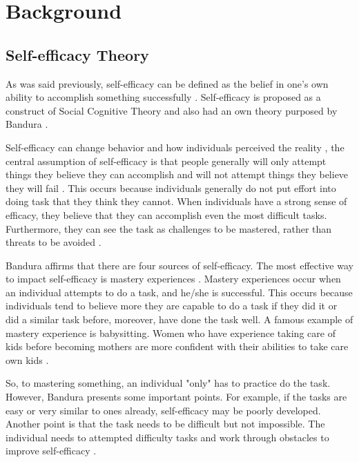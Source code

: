 \documentclass[10pt, conference]{IEEEtran}
\begin{document}
\section{Background}
\label{background}

\subsection{Self-efficacy Theory}
As was said previously, self-efficacy can be defined as the belief in one's own ability to accomplish something successfully  \cite{bandura1977self}. Self-efficacy is proposed as a construct of Social Cognitive Theory \cite{bandura1977social} and also had an own theory purposed by Bandura \cite{bandura1977self}. 

Self-efficacy can change behavior and how individuals perceived the reality \cite{bandura2010self}, the central assumption of self-efficacy is that people generally will only attempt things they believe they can accomplish and will not attempt things they believe they will fail \cite{bandura1977self}. This occurs because individuals generally do not put effort into doing task that they think they cannot. When individuals have a strong sense of efficacy, they believe that they can accomplish even the most difficult tasks. Furthermore, they can see the task as challenges to be mastered, rather than threats to be avoided \cite{bandura1994ramachaudran}.

Bandura affirms that there are four sources of self-efficacy. The most effective way to impact self-efficacy is mastery experiences \cite{bandura1994ramachaudran}. Mastery experiences occur when an individual attempts to do a task, and he/she is successful. This occurs because individuals tend to believe more they are capable to do a task if they did it or did a similar task before,  moreover, have done the task well. A famous example of mastery experience is babysitting. Women who have experience taking care of kids before becoming mothers are more confident with their abilities to take care own kids \cite{froman1989infant}.

So, to mastering something, an individual "only" has to practice do the task. However, Bandura \cite{bandura1994ramachaudran} presents some important points. For example, if the tasks are easy or very similar to ones already, self-efficacy may be poorly developed. Another point is that the task needs to be difficult but not impossible. The individual needs to attempted difficulty tasks and work through obstacles to improve self-efficacy \cite{bandura2010self}. 
\end{document}
